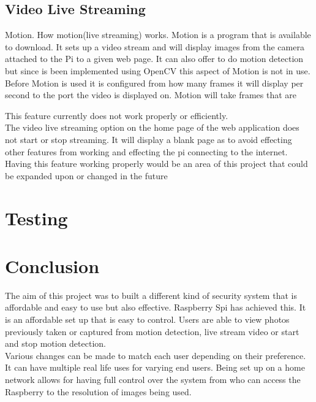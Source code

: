 \documentclass[]{report}
\begin{document}
\section{Video Live Streaming}
\label{sec:video}
Motion. How motion(live streaming) works.
Motion is a program that is available to download. It sets up a video stream and will display images from the camera attached to the Pi to a given web page. It can also offer to do motion detection but since is been implemented using OpenCV this aspect of Motion is not in use.\\

Before Motion is used it is configured from how many frames it will display per second to the port the video is displayed on. Motion will take frames that are

This feature currently does not work properly or efficiently.\\

The video live streaming option on the home page of the web application does not start or stop streaming. It will display a blank page as to avoid effecting other features from working and effecting the pi connecting to the internet. Having this feature working properly would be an area of this project that could be expanded upon or changed in the future\\


\chapter{Testing}
\label{ch:test}
%
%
%
%
%
\chapter{Conclusion}
\label{ch:concl}
%
%
%
%
The aim of this project was to built a different kind of security system that is affordable and easy to use but also effective. Raspberry Spi has achieved this. It is an affordable set up that is easy to control. Users are able to view photos previously taken or captured from motion detection, live stream video or start and stop motion detection.\\

Various changes can be made to match each user depending on their preference. It can have multiple real life uses for varying end users. Being set up on a home network allows for having full control over the system from who can access the Raspberry to the resolution of images being used.\\
\end{document}
